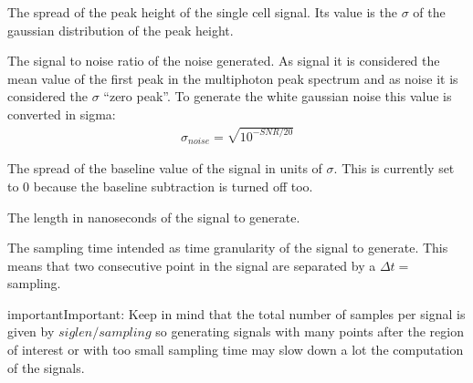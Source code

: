 \documentclass[letterpaper,10pt,english]{sphinxmanual}
\begin{document}
\begin{fulllineitems}
The spread of the peak height of the single cell signal. Its value is the \(\sigma\) of the gaussian distribution of the peak height.

\end{fulllineitems}



\begin{fulllineitems}
The signal to noise ratio of the noise generated. As signal it is considered the mean value of the first peak in the multi\sphinxhyphen{}photon peak spectrum and as noise it is considered the \(\sigma\) “zero peak”.
To generate the white gaussian noise this value is converted in sigma:
\begin{equation*}
\begin{split}\sigma_{noise} = \sqrt{10^{-SNR/20}}\end{split}
\end{equation*}
\end{fulllineitems}



\begin{fulllineitems}
The spread of the baseline value of the signal in units of \(\sigma\). This is currently set to 0 because the baseline subtraction is turned off too.

\end{fulllineitems}



\begin{fulllineitems}
The length in nanoseconds of the signal to generate.

\end{fulllineitems}



\begin{fulllineitems}
The sampling time intended as time granularity of the signal to generate. This means that two consecutive point in the signal are separated by a \(\Delta t=\) sampling.

\begin{sphinxadmonition}{important}{Important:}
Keep in mind that the total number of samples per signal is given by \(siglen/sampling\) so generating signals with many points after the region of interest or with too small sampling time may slow down a lot the computation of the signals.
\end{sphinxadmonition}

\end{fulllineitems}
\end{document}
